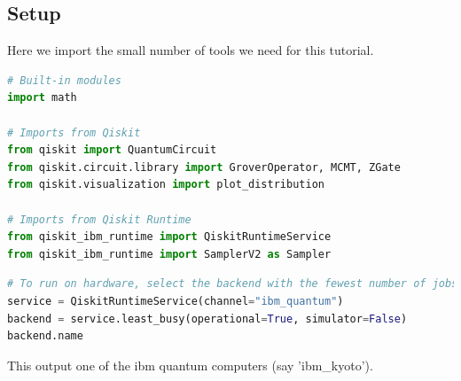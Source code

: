 \documentclass[12pt, oneside]{book}
\theoremstyle{definition}
\theoremstyle{definition}
\theoremstyle{remark}
\begin{document}
\subsection{Setup}
Here we import the small number of tools we need for this tutorial.
\begin{lstlisting}[language=Python]
# Built-in modules
import math

# Imports from Qiskit
from qiskit import QuantumCircuit
from qiskit.circuit.library import GroverOperator, MCMT, ZGate
from qiskit.visualization import plot_distribution

# Imports from Qiskit Runtime
from qiskit_ibm_runtime import QiskitRuntimeService
from qiskit_ibm_runtime import SamplerV2 as Sampler
\end{lstlisting}
\begin{lstlisting}[language=Python]
# To run on hardware, select the backend with the fewest number of jobs in the queue
service = QiskitRuntimeService(channel="ibm_quantum")
backend = service.least_busy(operational=True, simulator=False)
backend.name
\end{lstlisting}
This output one of the ibm quantum computers (say 'ibm\_kyoto').
\end{document}
